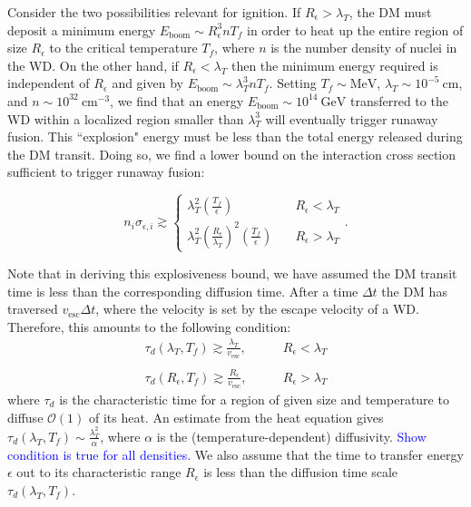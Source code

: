 \documentclass[twocolumn,showpacs,preprintnumbers,amsmath,amssymb,prl]{revtex4}
\newcommand{\OO}{\mathcal{O}}
\def\r{\right)}
\def\l{\left(}
\begin{document}
Consider the two possibilities relevant for ignition. If $R_\epsilon> \lambda_T$, the DM must deposit a minimum energy $E_{\text{boom}} \sim R_\epsilon^3 n T_f$ in order to heat up the entire region of size $R_\epsilon$ to the critical temperature $T_f$, where $n$ is the number density of nuclei in the WD. On the other hand, if $R_\epsilon < \lambda_T$ then the minimum energy required is independent of $R_\epsilon$ and given by $E_{\text{boom}} \sim \lambda_T^3 n T_f$. Setting $T_f \sim \text{MeV}$, $\lambda_T \sim 10^{-5} ~\text{cm}$, and $n \sim 10^{32} ~\text{cm}^{-3}$, we find that an energy $E_{\text{boom}} \sim 10^{14} ~\text{GeV}$ transferred to the WD within a localized region smaller than $\lambda_T^3$ will eventually trigger runaway fusion. This ``explosion" energy must be less than the total energy released during the DM transit. Doing so, we find a lower bound on the interaction cross section sufficient to trigger runaway fusion: 

\begin{equation}
\label{eq:explosion}
n_i \sigma_{\epsilon,i} \gtrsim \left\{
        \begin{array}{ll}
            \displaystyle \lambda_T^2 \l \frac{T_f}{\epsilon} \r & \quad R_\epsilon < \lambda_T \\
             \lambda_T^2 \l \frac{R_\epsilon}{\lambda_T}\r^2 \l \frac{T_f}{\epsilon} \r & \quad R_\epsilon > \lambda_T
        \end{array}
    \right..
\end{equation}

Note that in deriving this explosiveness bound, we have assumed the DM transit time is less than the corresponding diffusion time. After a time $\Delta t$ the DM has traversed $v_{\text{esc}} \Delta t$, where the velocity is set by the escape velocity of a WD. Therefore, this amounts to the following condition:
\begin{equation}
\begin{array}{ll}
             \tau_d(\lambda_T, T_f) \gtrsim \frac{\lambda_T}{v_{\text{esc}}}, & \quad \quad R_\epsilon < \lambda_T \\ \\
            \tau_d(R_\epsilon, T_f)  \gtrsim \frac{R_\epsilon}{v_{\text{esc}}},  & \quad \quad R_\epsilon > \lambda_T
        \end{array}
\end{equation}
where $\tau_d$ is the characteristic time for a region of given size and temperature to diffuse $\OO(1)$ of its heat. An estimate from the heat equation gives $\tau_d(\lambda_T, T_f) \sim \frac{\lambda_T^2}{\alpha}$, where $\alpha$ is the (temperature-dependent) diffusivity. \textcolor{blue}{Show condition is true for all densities.} We also assume that the time to transfer energy $\epsilon$ out to its characteristic range $R_\epsilon$ is less than the diffusion time scale $\tau_d(\lambda_T, T_f)$.
\end{document}
